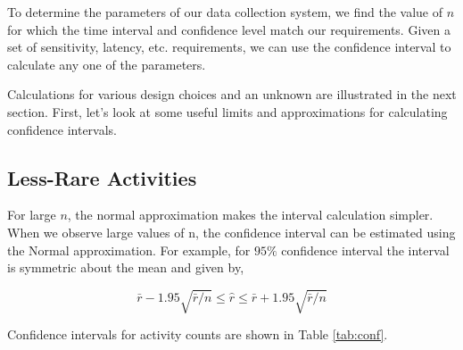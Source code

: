 \documentclass{article}
\begin{document}

To determine the parameters of our data collection system, we find the value of $n$ for which the time interval and confidence level match our requirements.  Given a set of sensitivity, latency, etc. requirements, we can use the confidence interval to calculate any one of the parameters. 

Calculations for various design choices and an unknown are illustrated in the next section.  First, let's look at some useful limits and approximations for calculating confidence intervals.

\subsection{Less-Rare Activities} 

For large $n$, the normal approximation makes the interval calculation simpler. When we observe large values of n, the confidence interval can be estimated using the Normal approximation. For example, for $95\%$ confidence interval the interval is symmetric about the mean and given by,

\begin{equation}
    \label{eq:largenconf}
    \bar{r} - 1.95 \sqrt{\bar{r}/n} \leq \hat{r} \leq \bar{r} + 1.95 \sqrt{\bar{r}/n}
\end{equation}

Confidence intervals for activity counts are shown in Table \ref{tab:conf}.
\end{document}
